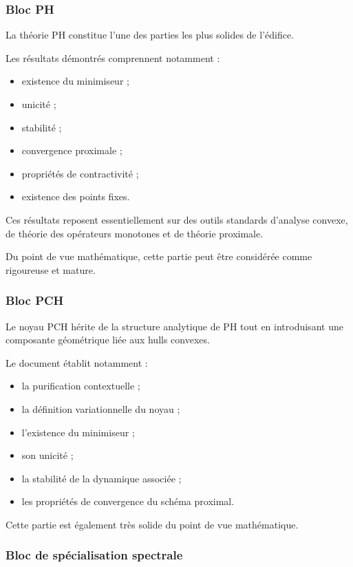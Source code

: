 \subsubsection{Bloc PH}

La théorie PH constitue l'une des parties les plus solides de l'édifice.

Les résultats démontrés comprennent notamment :

\begin{itemize}
    \item existence du minimiseur ;
    \item unicité ;
    \item stabilité ;
    \item convergence proximale ;
    \item propriétés de contractivité ;
    \item existence des points fixes.
\end{itemize}

Ces résultats reposent essentiellement sur des outils standards d'analyse convexe, de théorie des opérateurs monotones et de théorie proximale.

Du point de vue mathématique, cette partie peut être considérée comme rigoureuse et mature.

\subsubsection{Bloc PCH}

Le noyau PCH hérite de la structure analytique de PH tout en introduisant une composante géométrique liée aux hulls convexes.

Le document établit notamment :

\begin{itemize}
    \item la purification contextuelle ;
    \item la définition variationnelle du noyau ;
    \item l'existence du minimiseur ;
    \item son unicité ;
    \item la stabilité de la dynamique associée ;
    \item les propriétés de convergence du schéma proximal.
\end{itemize}

Cette partie est également très solide du point de vue mathématique.

\subsubsection{Bloc de spécialisation spectrale}

